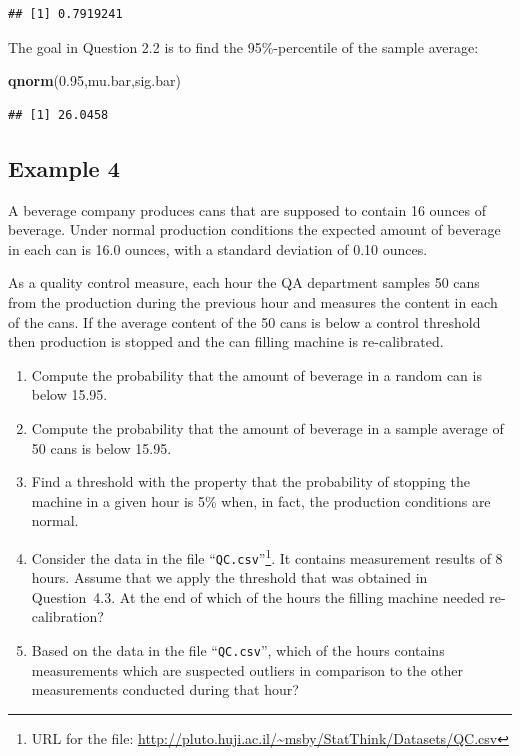 \documentclass[
]{krantz}
\makeatletter
\newenvironment{Shaded}{\begin{snugshade}}{\end{snugshade}}
\newcommand{\FloatTok}[1]{\textcolor[rgb]{0.00,0.00,0.81}{#1}}
\newcommand{\KeywordTok}[1]{\textcolor[rgb]{0.13,0.29,0.53}{\textbf{#1}}}
\newcommand{\NormalTok}[1]{#1}
\newenvironment{kframe}{%
\medskip{}
\setlength{\fboxsep}{.8em}
 \def\at@end@of@kframe{}%
 \ifinner\ifhmode%
  \def\at@end@of@kframe{\end{minipage}}%
  \begin{minipage}{\columnwidth}%
 \fi\fi%
 \def\FrameCommand##1{\hskip\@totalleftmargin \hskip-\fboxsep
 \colorbox{shadecolor}{##1}\hskip-\fboxsep
     \hskip-\linewidth \hskip-\@totalleftmargin \hskip\columnwidth}%
 \MakeFramed {\advance\hsize-\width
   \@totalleftmargin\z@ \linewidth\hsize
   \@setminipage}}%
 {\par\unskip\endMakeFramed%
 \at@end@of@kframe}
\renewenvironment{Shaded}{\begin{kframe}}{\end{kframe}}
\theoremstyle{definition}
\theoremstyle{definition}
\theoremstyle{definition}
\theoremstyle{remark}
\makeatother
\begin{document}
\begin{verbatim}
## [1] 0.7919241
\end{verbatim}

The goal in Question 2.2 is to find the 95\%-percentile of the sample
average:

\begin{Shaded}
\begin{Highlighting}[]
\KeywordTok{qnorm}\NormalTok{(}\FloatTok{0.95}\NormalTok{,mu.bar,sig.bar)}
\end{Highlighting}
\end{Shaded}

\begin{verbatim}
## [1] 26.0458
\end{verbatim}

\hypertarget{example-4}{%
\subsection{Example 4}\label{example-4}}

A beverage company produces cans that are supposed to contain 16 ounces
of beverage. Under normal production conditions the expected amount of
beverage in each can is 16.0 ounces, with a standard deviation of 0.10
ounces.

As a quality control measure, each hour the QA department samples 50
cans from the production during the previous hour and measures the
content in each of the cans. If the average content of the 50 cans is
below a control threshold then production is stopped and the can filling
machine is re-calibrated.

\begin{enumerate}
\def\labelenumi{\arabic{enumi}.}
\item
  Compute the probability that the amount of beverage in a random can
  is below 15.95.
\item
  Compute the probability that the amount of beverage in a sample
  average of 50 cans is below 15.95.
\item
  Find a threshold with the property that the probability of stopping
  the machine in a given hour is 5\% when, in fact, the production
  conditions are normal.
\item
  Consider the data in the file ``\texttt{QC.csv}''\footnote{URL for the file:
    \url{http://pluto.huji.ac.il/~msby/StatThink/Datasets/QC.csv}}. It contains
  measurement results of 8 hours. Assume that we apply the threshold
  that was obtained in Question~4.3. At the end of which of the hours
  the filling machine needed re-calibration?
\item
  Based on the data in the file ``\texttt{QC.csv}'', which of the hours
  contains measurements which are suspected outliers in comparison to
  the other measurements conducted during that hour?
\end{enumerate}
\end{document}
